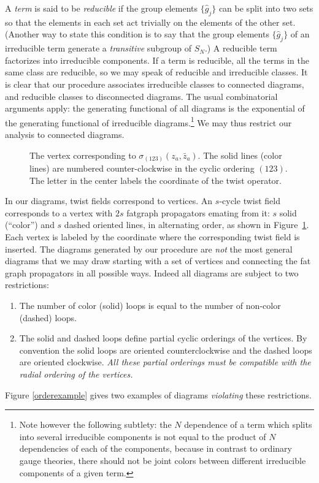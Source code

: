 \documentclass[letterpaper]{JHEP3}
\begin{document}
A {\it term}  is said to be {\it reducible}
if the group elements  $ \{ \hat g_j \}$  can be split into two sets so that the elements in each set
act trivially on the elements of the other set.  (Another way to state this condition is to say that the group elements $ \{ \hat g_j \}$  of an irreducible term generate a {\it transitive} subgroup of $S_N$.)
A reducible term factorizes into irreducible components.
If a term is reducible, all the terms in the same class are reducible, so we may
speak of reducible and irreducible classes.
It is clear that our procedure associates irreducible classes 
to connected diagrams, and reducible classes to disconnected diagrams.
The usual combinatorial arguments apply: the generating functional of all diagrams is the exponential
of the generating functional of irreducible diagrams.\footnote{Note however the following subtlety: the $N$ dependence of a term which splits into 
several irreducible components is not equal to the product of $N$ dependencies of each of the components, because
in contrast to ordinary gauge
 theories, there should not 
  be joint colors between different irreducible components of a given term.}
We may thus restrict our analysis to connected diagrams.



\begin{figure}[htbp]
\begin{center}
\caption{The vertex corresponding to $\sigma_{(123)}(z_a, \bar z_a)$. The solid lines (color lines) are numbered counter-clockwise
in the cyclic ordering $(123)$. The letter in the center labels the coordinate of the twist operator.
} 
\label{vertexsym}
\end{center}
\end{figure}




In our diagrams, twist fields correspond to vertices. An $s$-cycle twist field  corresponds
to a vertex with $2s$ fatgraph propagators emating from it: $s$ solid (``color'') and $s$ dashed 
 oriented lines,  in alternating order, as shown in Figure~\ref{vertexsym}.  Each vertex is labeled by the coordinate
 where the corresponding twist field is inserted.
 The diagrams generated by our procedure are {\it not} the most general diagrams 
that we may draw starting with a set of vertices and connecting the fat graph propagators in all possible ways.
 Indeed all diagrams are subject to two restrictions:
 \begin{enumerate}
\item
 { The number of color (solid) loops is equal to the number of non-color (dashed) loops.  }
\item
The solid and dashed loops define  partial cyclic orderings of the vertices.
By convention the  solid loops are oriented counterclockwise 
and the dashed loops are oriented clockwise.
{\it  All these partial orderings  must be compatible with the radial ordering of the vertices.}
\end{enumerate}
Figure \ref{orderexample} gives two examples of  diagrams {\it violating} these restrictions.
\end{document}
